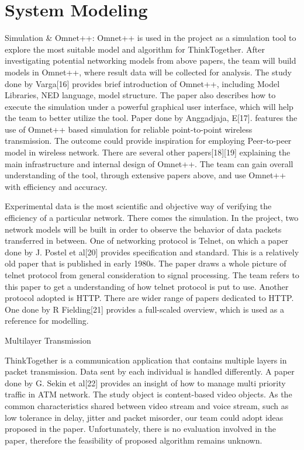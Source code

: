 \section{System Modeling}

Simulation \& Omnet++:
Omnet++ is used in the project as a simulation tool to explore the most suitable model and algorithm for ThinkTogether. After investigating potential networking models from above papers, the team will build models in Omnet++, where result data will be collected for analysis. The study done by Varga[16] provides brief introduction of Omnet++, including Model Libraries, NED language, model structure. The paper also describes how to execute the simulation under a powerful graphical user interface, which will help the team to better utilize the tool. Paper done by Anggadjaja, E[17]. features the use of Omnet++ based simulation for reliable point-to-point wireless transmission. The outcome could provide inspiration for employing Peer-to-peer model in wireless network. There are several other papers[18][19] explaining the main infrastructure and internal design of Omnet++. The team can gain overall understanding of the tool, through extensive papers above, and use Omnet++ with efficiency and accuracy. 

Experimental data is the most scientific and objective way of verifying the efficiency of a particular network. There comes the simulation. In the project, two network models will be built in order to observe the behavior of data packets transferred in between. One of networking protocol is Telnet, on which a paper done by J. Postel et al[20] provides specification and standard. This is a relatively old paper that is published in early 1980s. The paper draws a whole picture of telnet protocol from general consideration to signal processing. The team refers to this paper to get a understanding of how telnet protocol is put to use. Another protocol adopted is HTTP. There are wider range of papers dedicated to HTTP. One done by R Fielding[21] provides a full-scaled overview, which is used as a reference for modelling. 

Multilayer Transmission

ThinkTogether is a communication application that contains multiple layers in packet transmission. Data sent by each individual is handled differently.  A paper done by G. Sekin et al[22] provides an insight of how to manage multi priority traffic in ATM network. The study object is content-based video objects. As the common characteristics shared between video stream and voice stream, such as low tolerance in delay, jitter and packet misorder, our team could adopt ideas proposed in the paper. Unfortunately, there is no evaluation involved in the paper, therefore the feasibility of proposed algorithm remains unknown. 

